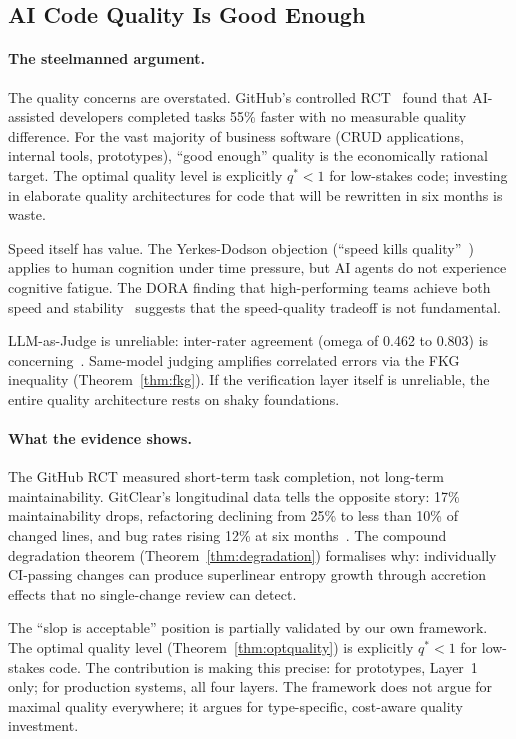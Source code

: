 \subsection{AI Code Quality Is Good Enough}
\label{sec:contrarian-quality}

\paragraph{The steelmanned argument.}
The quality concerns are overstated. GitHub's controlled RCT~\citep{github2024rct} found that AI-assisted developers completed tasks 55\% faster with no measurable quality difference. For the vast majority of business software (CRUD applications, internal tools, prototypes), ``good enough'' quality is the economically rational target. The optimal quality level is explicitly $q^* < 1$ for low-stakes code; investing in elaborate quality architectures for code that will be rewritten in six months is waste.

Speed itself has value. The Yerkes-Dodson objection (``speed kills quality''~\citep{yerkes1908relation}) applies to human cognition under time pressure, but AI agents do not experience cognitive fatigue. The DORA finding that high-performing teams achieve both speed and stability~\citep{forsgren2018accelerate} suggests that the speed-quality tradeoff is not fundamental.

LLM-as-Judge is unreliable: inter-rater agreement (omega of 0.462 to 0.803) is concerning~\citep{llmjudgetrust2024}. Same-model judging amplifies correlated errors via the FKG inequality (Theorem~\ref{thm:fkg}). If the verification layer itself is unreliable, the entire quality architecture rests on shaky foundations.

\paragraph{What the evidence shows.}
The GitHub RCT measured short-term task completion, not long-term maintainability. GitClear's longitudinal data tells the opposite story: 17\% maintainability drops, refactoring declining from 25\% to less than 10\% of changed lines, and bug rates rising 12\% at six months~\citep{gitclear2025}. The compound degradation theorem (Theorem~\ref{thm:degradation}) formalises why: individually CI-passing changes can produce superlinear entropy growth through accretion effects that no single-change review can detect.

The ``slop is acceptable'' position is partially validated by our own framework. The optimal quality level (Theorem~\ref{thm:optquality}) is explicitly $q^* < 1$ for low-stakes code. The contribution is making this precise: for prototypes, Layer~1 only; for production systems, all four layers. The framework does not argue for maximal quality everywhere; it argues for type-specific, cost-aware quality investment.

